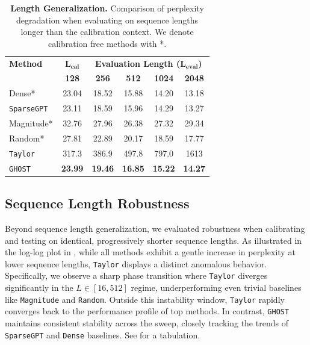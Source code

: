 \documentclass{article}
\theoremstyle{plain}
\theoremstyle{definition}
\theoremstyle{remark}
\begin{document}

\begin{table}[!ht]
\centering
\caption{\textbf{Length Generalization.} Comparison of perplexity degradation when evaluating on sequence lengths longer than the calibration context. We denote calibration free methods with *.}
\label{tab:length_generalization}
\begin{tabular}{l|c|cccc}
\toprule
\textbf{Method} & \textbf{$\bm{L_{\text{cal}}}$} & \multicolumn{4}{c}{\textbf{Evaluation Length ($\bm{L_{\text{eval}}}$)}} \\
& \textbf{128} & \textbf{256} & \textbf{512} & \textbf{1024} & \textbf{2048} \\
\midrule
Dense* & 23.04 & 18.52 & 15.88 & 14.20 & 13.18 \\
\texttt{SparseGPT} & 23.11 & 18.59 & 15.96 & 14.29 & 13.27 \\
\midrule
Magnitude* & 32.76 & 27.96 & 26.38 & 27.32 & 29.34 \\
Random* & 27.81 & 22.89 & 20.17 & 18.59 & 17.77 \\
\texttt{Taylor} & 317.3 & 386.9 & 497.8 & 797.0 & 1613 \\
\texttt{GHOST} & \textbf{23.99} & \textbf{19.46} & \textbf{16.85} & \textbf{15.22} & \textbf{14.27} \\
\bottomrule
\end{tabular}
\end{table}

\subsection{Sequence Length Robustness}
\label{subsec:length_robust}

Beyond sequence length generalization, we evaluated robustness when calibrating and testing on identical, progressively shorter sequence lengths. As illustrated in the log-log plot in , while all methods exhibit a gentle increase in perplexity at lower sequence lengths, \texttt{Taylor} displays a distinct anomalous behavior. Specifically, we observe a sharp phase transition where \texttt{Taylor} diverges significantly in the $L \in [16, 512]$ regime, underperforming even trivial baselines like \texttt{Magnitude} and \texttt{Random}. Outside this instability window, \texttt{Taylor} rapidly converges back to the performance profile of top methods. In contrast, \texttt{GHOST} maintains consistent stability across the sweep, closely tracking the trends of \texttt{SparseGPT} and \texttt{Dense} baselines. See   for a tabulation.
\end{document}

